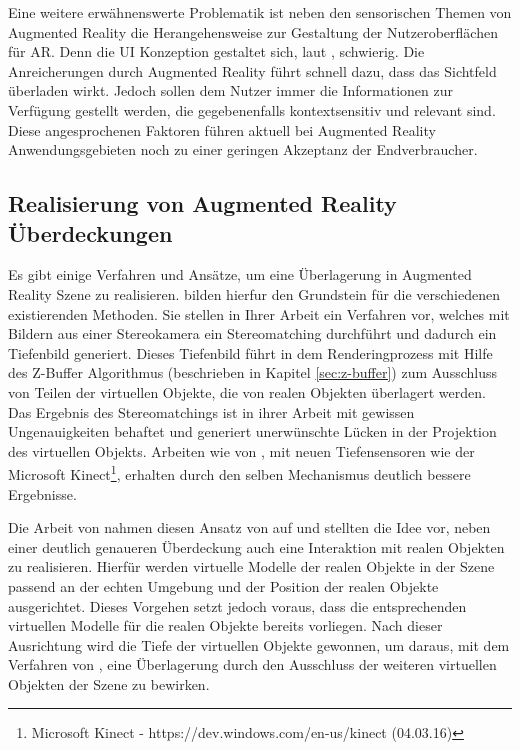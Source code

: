 Eine weitere erwähnenswerte Problematik ist neben den sensorischen Themen von Augmented Reality die Herangehensweise zur Gestaltung der Nutzeroberflächen für AR. Denn die UI Konzeption gestaltet sich, laut \citet{azuma2001recent}, schwierig. Die Anreicherungen durch Augmented Reality führt schnell dazu, dass das Sichtfeld überladen wirkt. Jedoch sollen dem Nutzer immer die Informationen zur Verfügung gestellt werden, die gegebenenfalls kontextsensitiv und relevant sind. Diese angesprochenen Faktoren führen aktuell bei Augmented Reality Anwendungsgebieten noch zu einer geringen Akzeptanz der Endverbraucher.

\subsection{Realisierung von Augmented Reality Über\-deckungen} \label{sec:ar-occlusion}

Es gibt einige Verfahren und Ansätze, um eine Überlagerung in Augmented Reality Szene zu realisieren. \citet{wloka1995resolving} bilden hierfur den Grundstein für die verschiedenen existierenden Methoden. Sie stellen in Ihrer Arbeit ein Verfahren vor, welches mit Bildern aus einer Stereokamera ein Stereomatching durchführt und dadurch ein Tiefenbild generiert. Dieses Tiefenbild führt in dem Renderingprozess mit Hilfe des Z-Buffer Algorithmus (beschrieben in Kapitel \ref{sec:z-buffer}) zum Ausschluss von Teilen der virtuellen Objekte, die von realen Objekten überlagert werden. Das Ergebnis des Stereomatchings ist in ihrer Arbeit mit gewissen Ungenauigkeiten behaftet und generiert unerwünschte Lücken in der Projektion des virtuellen Objekts. Arbeiten wie von \citet{seo2013direct}, mit neuen Tiefensensoren wie der Microsoft Kinect\footnote{Microsoft Kinect - https://dev.windows.com/en-us/kinect (04.03.16)}, erhalten durch den selben Mechanismus deutlich bessere Ergebnisse. 

Die Arbeit von \citet{breen1996interactive} nahmen diesen Ansatz von \citet{wloka1995resolving} auf und stellten die Idee vor, neben einer deutlich genaueren Überdeckung auch eine Interaktion mit realen Objekten zu realisieren. Hierfür werden virtuelle Modelle der realen Objekte in der Szene passend an der echten Umgebung und der Position der realen Objekte ausgerichtet. Dieses Vorgehen setzt jedoch voraus, dass die entsprechenden virtuellen Modelle für die realen Objekte bereits vorliegen. Nach dieser Ausrichtung wird die Tiefe der virtuellen Objekte gewonnen, um daraus, mit dem Verfahren von \citet{wloka1995resolving}, eine Überlagerung durch den Ausschluss der weiteren virtuellen Objekten der Szene zu bewirken. 

